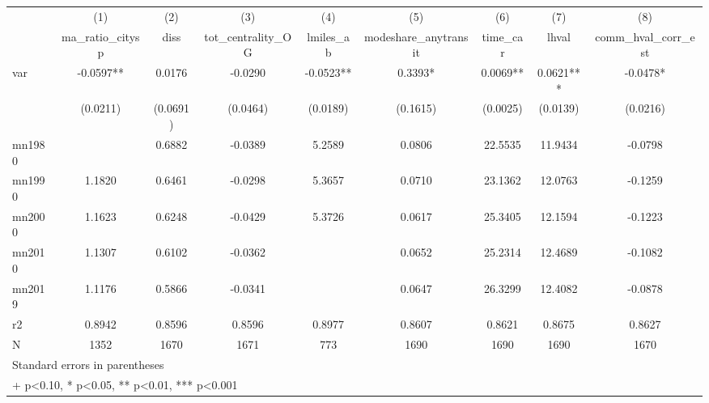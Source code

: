 {
\def\sym#1{\ifmmode^{#1}\else\(^{#1}\)\fi}
\begin{tabular}{l*{8}{c}}
\toprule
            &\multicolumn{1}{c}{(1)}   &\multicolumn{1}{c}{(2)}   &\multicolumn{1}{c}{(3)}   &\multicolumn{1}{c}{(4)}   &\multicolumn{1}{c}{(5)}   &\multicolumn{1}{c}{(6)}   &\multicolumn{1}{c}{(7)}   &\multicolumn{1}{c}{(8)}   \\
            &ma\_ratio\_citysp   &        diss   &tot\_centrality\_OG   &   lmiles\_ab   &modeshare\_anytransit   &    time\_car   &       lhval   &comm\_hval\_corr\_est   \\
\midrule
var         &     -0.0597** &      0.0176   &     -0.0290   &     -0.0523** &      0.3393*  &      0.0069** &      0.0621***&     -0.0478*  \\
            &    (0.0211)   &    (0.0691)   &    (0.0464)   &    (0.0189)   &    (0.1615)   &    (0.0025)   &    (0.0139)   &    (0.0216)   \\
\midrule
mn1980      &               &      0.6882   &     -0.0389   &      5.2589   &      0.0806   &     22.5535   &     11.9434   &     -0.0798   \\
mn1990      &      1.1820   &      0.6461   &     -0.0298   &      5.3657   &      0.0710   &     23.1362   &     12.0763   &     -0.1259   \\
mn2000      &      1.1623   &      0.6248   &     -0.0429   &      5.3726   &      0.0617   &     25.3405   &     12.1594   &     -0.1223   \\
mn2010      &      1.1307   &      0.6102   &     -0.0362   &               &      0.0652   &     25.2314   &     12.4689   &     -0.1082   \\
mn2019      &      1.1176   &      0.5866   &     -0.0341   &               &      0.0647   &     26.3299   &     12.4082   &     -0.0878   \\
r2          &      0.8942   &      0.8596   &      0.8596   &      0.8977   &      0.8607   &      0.8621   &      0.8675   &      0.8627   \\
N           &        1352   &        1670   &        1671   &         773   &        1690   &        1690   &        1690   &        1670   \\
\bottomrule
\multicolumn{9}{l}{\footnotesize Standard errors in parentheses}\\
\multicolumn{9}{l}{\footnotesize + p<0.10, * p<0.05, ** p<0.01, *** p<0.001}\\
\end{tabular}
}
